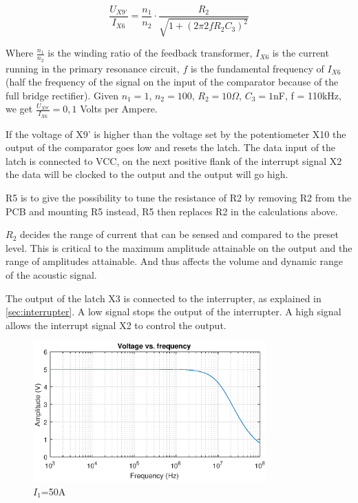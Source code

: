 \begin{equation} \label{eq:limittrans}
    \frac{U_{X9'}}{I_{X6}} = \frac{n_1}{n_2} \cdot \frac{R_2}{\sqrt{1+(2 \pi 2 f R_2 C_3)^2}}
\end{equation}

Where $\frac{n_1}{n_2}$ is the winding ratio of the feedback transformer, $I_{X6}$ is the current running in the primary resonance circuit, $f$ is the fundamental frequency of $I_{X6}$ (half the frequency of the signal on the input of the comparator because of the full bridge rectifier). Given $n_1 = 1$, $n_2 = 100$, $R_2 = 10\Omega$, $C_3 = 1$nF, f = 110kHz, we get $\frac{U_{X9'}}{I_{X6}} = 0,1$ Volts per Ampere.

If the voltage of X9' is higher than the voltage set by the potentiometer X10 the output of the comparator goes low and resets the latch. The data input of the latch is connected to VCC, on the next positive flank of the interrupt signal X2 the data will be clocked to the output and the output will go high.

R5 is to give the possibility to tune the resistance of R2 by removing R2 from the PCB and mounting R5 instead, R5 then replaces R2 in the calculations above.

$R_2$ decides the range of current that can be sensed and compared to the preset level. This is critical to the maximum amplitude attainable on the output and the range of amplitudes attainable. And thus affects the volume and dynamic range of the acoustic signal.

The output of the latch X3 is connected to the interrupter, as explained in \cref{sec:interrupter}. A low signal stops the output of the interrupter. A high signal allows the interrupt signal X2 to control the output.


\begin{figure}
    \centering
    \includegraphics[trim={0cm 1.2cm 0cm 2cm},clip,width=0.8\textwidth]{img/LimiterTransfer.eps}
    \caption{$I_1$=50A}
    \label{fig:limitertransfer}
\end{figure}


